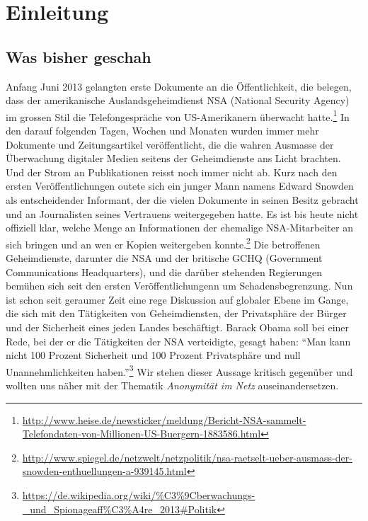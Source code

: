 \newpage
\section{Einleitung}

\subsection{Was bisher geschah}
Anfang Juni 2013 gelangten erste Dokumente an die Öffentlichkeit, die belegen, dass der amerikanische Auslandsgeheimdienst NSA (National Security Agency) im grossen Stil die Telefongespräche von US-Amerikanern überwacht hatte.\footnote{\url{http://www.heise.de/newsticker/meldung/Bericht-NSA-sammelt-Telefondaten-von-Millionen-US-Buergern-1883586.html}}
In den darauf folgenden Tagen, Wochen und Monaten wurden immer mehr Dokumente und Zeitungsartikel veröffentlicht, die die wahren Ausmasse der Überwachung digitaler Medien seitens der Geheimdienste ans Licht brachten. Und der Strom an Publikationen reisst noch immer nicht ab. Kurz nach den ersten Veröffentlichungen outete sich ein junger Mann namens Edward Snowden als entscheidender Informant, der die vielen Dokumente in seinen Besitz gebracht und an Journalisten seines Vertrauens weitergegeben hatte. Es ist bis heute nicht offiziell klar, welche Menge an Informationen der ehemalige NSA-Mitarbeiter an sich bringen und an wen er Kopien weitergeben konnte.\footnote{\url{http://www.spiegel.de/netzwelt/netzpolitik/nsa-raetselt-ueber-ausmass-der-snowden-enthuellungen-a-939145.html}}
Die betroffenen Geheimdienste, darunter die NSA und der britische GCHQ (Government Communications Headquarters), und die darüber stehenden Regierungen bemühen sich seit den ersten Veröffentlichungenn um Schadensbegrenzung. Nun ist schon seit geraumer Zeit eine rege Diskussion auf globaler Ebene im Gange, die sich mit den Tätigkeiten von Geheimdiensten, der Privatsphäre der Bürger und der Sicherheit eines jeden Landes beschäftigt. Barack Obama soll bei einer Rede, bei der er die Tätigkeiten der NSA verteidigte, gesagt haben: ``Man kann nicht 100 Prozent Sicherheit und 100 Prozent Privatsphäre und null Unannehmlichkeiten haben.''\footnote{\url{https://de.wikipedia.org/wiki/\%C3\%9Cberwachungs-_und_Spionageaff\%C3\%A4re_2013\#Politik}}
Wir stehen dieser Aussage kritisch gegenüber und wollten uns näher mit der Thematik \textit{Anonymität im Netz} auseinandersetzen.

